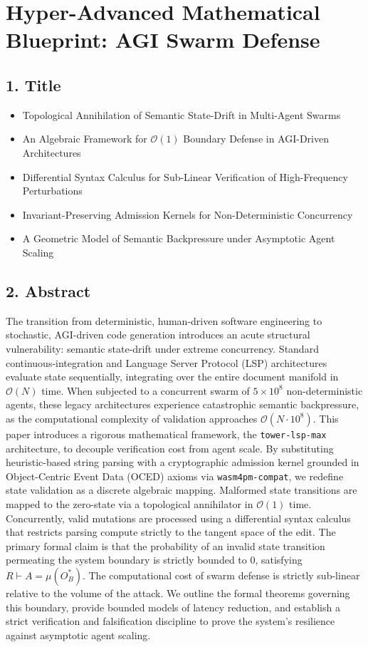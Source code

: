 \chapter{Hyper-Advanced Mathematical Blueprint: AGI Swarm Defense}

\section{1. Title}
\begin{itemize}
    \item Topological Annihilation of Semantic State-Drift in Multi-Agent Swarms
    \item An Algebraic Framework for $\mathcal{O}(1)$ Boundary Defense in AGI-Driven Architectures
    \item Differential Syntax Calculus for Sub-Linear Verification of High-Frequency Perturbations
    \item Invariant-Preserving Admission Kernels for Non-Deterministic Concurrency
    \item A Geometric Model of Semantic Backpressure under Asymptotic Agent Scaling
\end{itemize}

\section{2. Abstract}
The transition from deterministic, human-driven software engineering to stochastic, AGI-driven code generation introduces an acute structural vulnerability: semantic state-drift under extreme concurrency. Standard continuous-integration and Language Server Protocol (LSP) architectures evaluate state sequentially, integrating over the entire document manifold in $\mathcal{O}(N)$ time. When subjected to a concurrent swarm of $5 \times 10^8$ non-deterministic agents, these legacy architectures experience catastrophic semantic backpressure, as the computational complexity of validation approaches $\mathcal{O}(N \cdot 10^8)$. This paper introduces a rigorous mathematical framework, the \texttt{tower-lsp-max} architecture, to decouple verification cost from agent scale. By substituting heuristic-based string parsing with a cryptographic admission kernel grounded in Object-Centric Event Data (OCED) axioms via \texttt{wasm4pm-compat}, we redefine state validation as a discrete algebraic mapping. Malformed state transitions are mapped to the zero-state via a topological annihilator in $\mathcal{O}(1)$ time. Concurrently, valid mutations are processed using a differential syntax calculus that restricts parsing compute strictly to the tangent space of the edit. The primary formal claim is that the probability of an invalid state transition permeating the system boundary is strictly bounded to 0, satisfying $R \vdash A = \mu(O_B^*)$. The computational cost of swarm defense is strictly sub-linear relative to the volume of the attack. We outline the formal theorems governing this boundary, provide bounded models of latency reduction, and establish a strict verification and falsification discipline to prove the system's resilience against asymptotic agent scaling.

